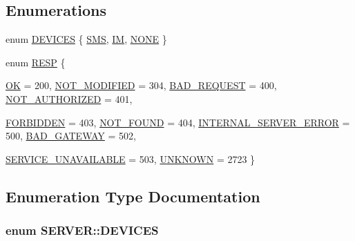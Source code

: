 \subsection*{Enumerations}
\begin{CompactItemize}
\item 
enum \hyperlink{namespaceSERVER_354160f0b752453a760c63ec882c8c87}{DEVICES} \{ \hyperlink{namespaceSERVER_354160f0b752453a760c63ec882c8c87f50a790cbac8f1e96907c01301bc9cec}{SMS}, 
\hyperlink{namespaceSERVER_354160f0b752453a760c63ec882c8c87ffc5909cbea07683162d0cfbe99f8946}{IM}, 
\hyperlink{namespaceSERVER_354160f0b752453a760c63ec882c8c874187c6017d8349d32ec06670af7e85fe}{NONE}
 \}
\item 
enum \hyperlink{namespaceSERVER_e274de6af58152c34520420007dfa0ea}{RESP} \{ \par
\hyperlink{namespaceSERVER_e274de6af58152c34520420007dfa0ea76c5bda024f277e1b764389ed15cdf45}{OK} =  200, 
\hyperlink{namespaceSERVER_e274de6af58152c34520420007dfa0ea195c137a28289b22369c6f8119492cac}{NOT\_\-MODIFIED} =  304, 
\hyperlink{namespaceSERVER_e274de6af58152c34520420007dfa0ea84eb39a31fb07a9810dc06d27223c9dd}{BAD\_\-REQUEST} =  400, 
\hyperlink{namespaceSERVER_e274de6af58152c34520420007dfa0ea70f29c2f30e73275f10a5b2876e3d4e5}{NOT\_\-AUTHORIZED} =  401, 
\par
\hyperlink{namespaceSERVER_e274de6af58152c34520420007dfa0eac81cb76a5224b622c976a90871280362}{FORBIDDEN} =  403, 
\hyperlink{namespaceSERVER_e274de6af58152c34520420007dfa0ea846d69f210d2454d905f2ae70c6445e9}{NOT\_\-FOUND} =  404, 
\hyperlink{namespaceSERVER_e274de6af58152c34520420007dfa0ea8d37a15fefbeea364587dea0b7e4879b}{INTERNAL\_\-SERVER\_\-ERROR} =  500, 
\hyperlink{namespaceSERVER_e274de6af58152c34520420007dfa0ea96ca8af1c38995d3c187196198b5566f}{BAD\_\-GATEWAY} =  502, 
\par
\hyperlink{namespaceSERVER_e274de6af58152c34520420007dfa0ea47b7b10dfd55871fb0be41d3c39b6a33}{SERVICE\_\-UNAVAILABLE} =  503, 
\hyperlink{namespaceSERVER_e274de6af58152c34520420007dfa0eaa56e5538dcf1c20806c3f667d785c414}{UNKNOWN} =  2723
 \}
\end{CompactItemize}


\subsection{Enumeration Type Documentation}
\hypertarget{namespaceSERVER_354160f0b752453a760c63ec882c8c87}{
\subsubsection{\setlength{\rightskip}{0pt plus 5cm}enum {\bf SERVER::DEVICES}}}
\label{namespaceSERVER_354160f0b752453a760c63ec882c8c87}


